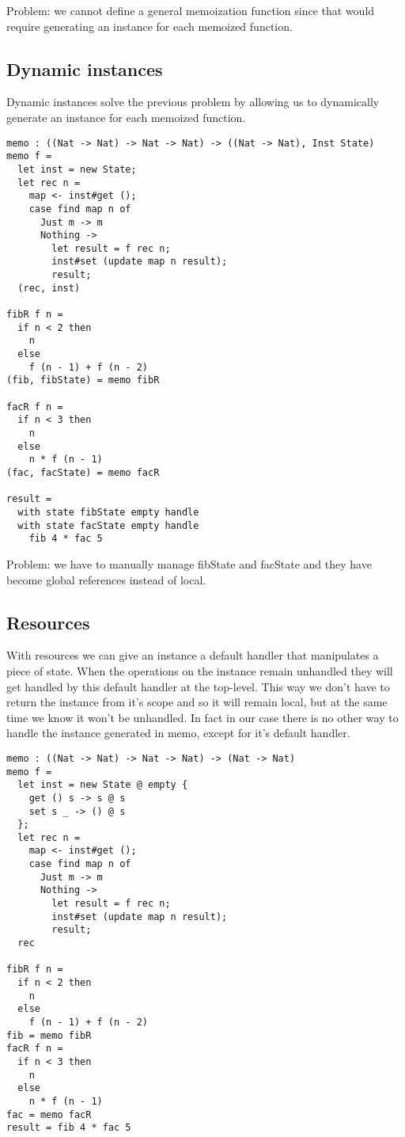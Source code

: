 \documentclass[12pt]{article}
\begin{document}
Problem: we cannot define a general memoization function since that would require generating an instance for each memoized function.

\newpage
\subsection{Dynamic instances}

Dynamic instances solve the previous problem by allowing us to dynamically generate an instance for each memoized function.
\begin{verbatim}
memo : ((Nat -> Nat) -> Nat -> Nat) -> ((Nat -> Nat), Inst State)
memo f =
  let inst = new State;
  let rec n =
    map <- inst#get ();
    case find map n of
      Just m -> m
      Nothing ->
        let result = f rec n;
        inst#set (update map n result);
        result;
  (rec, inst)

fibR f n =
  if n < 2 then
    n
  else
    f (n - 1) + f (n - 2)
(fib, fibState) = memo fibR

facR f n =
  if n < 3 then
    n
  else
    n * f (n - 1)
(fac, facState) = memo facR

result =
  with state fibState empty handle
  with state facState empty handle
    fib 4 * fac 5
\end{verbatim}

Problem: we have to manually manage fibState and facState and they have become global references instead of local.

\newpage
\subsection{Resources}

With resources we can give an instance a default handler that manipulates a piece of state.
When the operations on the instance remain unhandled they will get handled by this default handler at the top-level.
This way we don't have to return the instance from it's scope and so it will remain local, but at the same time we know it won't be unhandled.
In fact in our case there is no other way to handle the instance generated in memo, except for it's default handler.
 
\begin{verbatim}
memo : ((Nat -> Nat) -> Nat -> Nat) -> (Nat -> Nat)
memo f =
  let inst = new State @ empty {
    get () s -> s @ s
    set s _ -> () @ s
  };
  let rec n =
    map <- inst#get ();
    case find map n of
      Just m -> m
      Nothing ->
        let result = f rec n;
        inst#set (update map n result);
        result;
  rec

fibR f n =
  if n < 2 then
    n
  else
    f (n - 1) + f (n - 2)
fib = memo fibR
facR f n =
  if n < 3 then
    n
  else
    n * f (n - 1)
fac = memo facR
result = fib 4 * fac 5
\end{verbatim}
\end{document}
